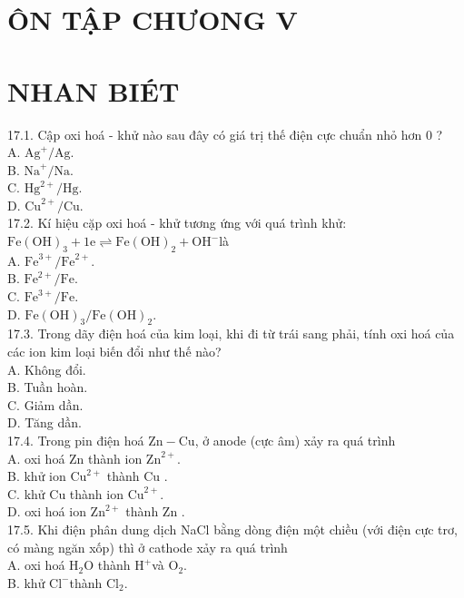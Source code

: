 \documentclass[10pt]{article}
\begin{document}
\section*{ÔN TẬP CHƯONG V}
\section*{NHAN BIÉT}
17.1. Cập oxi hoá - khử nào sau đây có giá trị thế điện cực chuẩn nhỏ hơn 0 ?\\
A. $\mathrm{Ag}^{+} / \mathrm{Ag}$.\\
B. $\mathrm{Na}^{+} / \mathrm{Na}$.\\
C. $\mathrm{Hg}^{2+} / \mathrm{Hg}$.\\
D. $\mathrm{Cu}^{2+} / \mathrm{Cu}$.\\
17.2. Kí hiệu cặp oxi hoá - khử tương ứng với quá trình khử: $\mathrm{Fe}(\mathrm{OH})_{3}+1 \mathrm{e} \rightleftharpoons \mathrm{Fe}(\mathrm{OH})_{2}+\mathrm{OH}^{-}$là\\
A. $\mathrm{Fe}^{3+} / \mathrm{Fe}^{2+}$.\\
B. $\mathrm{Fe}^{2+} / \mathrm{Fe}$.\\
C. $\mathrm{Fe}^{3+} / \mathrm{Fe}$.\\
D. $\mathrm{Fe}(\mathrm{OH})_{3} / \mathrm{Fe}(\mathrm{OH})_{2}$.\\
17.3. Trong dãy điện hoá của kim loại, khi đi từ trái sang phải, tính oxi hoá của các ion kim loại biến đổi như thế nào?\\
A. Không đổi.\\
B. Tuần hoàn.\\
C. Giảm dần.\\
D. Tăng dần.\\
17.4. Trong pin điện hoá $\mathrm{Zn}-\mathrm{Cu}$, ở anode (cực âm) xảy ra quá trình\\
A. oxi hoá Zn thành ion $\mathrm{Zn}^{2+}$.\\
B. khử ion $\mathrm{Cu}^{2+}$ thành Cu .\\
C. khử Cu thành ion $\mathrm{Cu}^{2+}$.\\
D. oxi hoá ion $\mathrm{Zn}^{2+}$ thành Zn .\\
17.5. Khi điện phân dung dịch NaCl bằng dòng điện một chiều (với điện cực trơ, có màng ngăn xốp) thì ở cathode xảy ra quá trình\\
A. oxi hoá $\mathrm{H}_{2} \mathrm{O}$ thành $\mathrm{H}^{+}$và $\mathrm{O}_{2}$.\\
B. khử $\mathrm{Cl}^{-}$thành $\mathrm{Cl}_{2}$.\\
\end{document}
